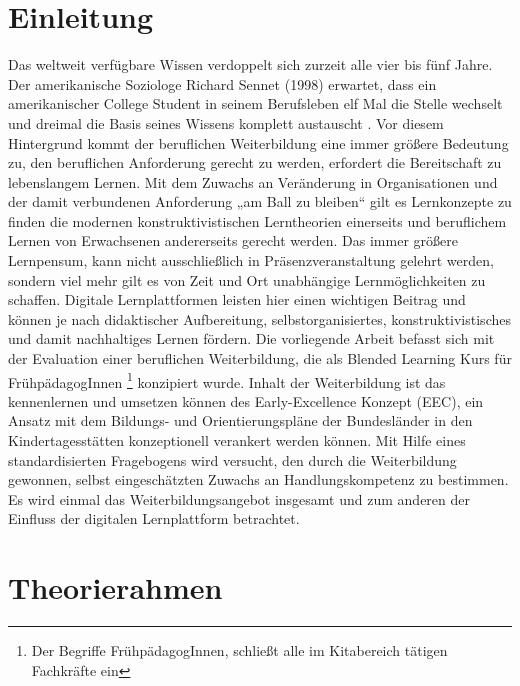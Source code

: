 \documentclass[12pt, bibliography=totoc]{scrartcl}
\begin{document}
%
\tableofcontents
\listoftables
\listoffigures
\clearpage
\pagebreak
{}
\section{Einleitung}\label{einleitung}

\glqq Das weltweit verfügbare Wissen verdoppelt sich zurzeit alle vier
bis fünf Jahre. Der amerikanische Soziologe Richard Sennet (1998)
erwartet, dass ein amerikanischer College Student in seinem Berufsleben
elf Mal die Stelle wechselt und dreimal die Basis seines Wissens
komplett austauscht \parencite[138]{Ehlers2002}.\grqq{} Vor diesem
Hintergrund kommt der beruflichen Weiterbildung eine immer größere
Bedeutung zu, den beruflichen Anforderung gerecht zu werden, erfordert
die Bereitschaft zu lebenslangem Lernen. Mit dem Zuwachs an Veränderung
in Organisationen und der damit verbundenen Anforderung „am Ball zu
bleiben`` gilt es Lernkonzepte zu finden die modernen
konstruktivistischen Lerntheorien einerseits und beruflichem Lernen von
Erwachsenen andererseits gerecht werden. Das immer größere Lernpensum,
kann nicht ausschließlich in Präsenzveranstaltung gelehrt werden,
sondern viel mehr gilt es von Zeit und Ort unabhängige Lernmöglichkeiten
zu schaffen. Digitale Lernplattformen leisten hier einen wichtigen
Beitrag und können je nach didaktischer Aufbereitung,
selbstorganisiertes, konstruktivistisches und damit nachhaltiges Lernen
fördern. Die vorliegende Arbeit befasst sich mit der Evaluation einer
beruflichen Weiterbildung, die als Blended Learning Kurs für
FrühpädagogInnen
\footnote{Der Begriffe FrühpädagogInnen, schließt alle im Kitabereich tätigen Fachkräfte ein}
konzipiert wurde. Inhalt der Weiterbildung ist das kennenlernen und
umsetzen können des Early-Excellence Konzept (EEC), ein Ansatz mit dem
Bildungs- und Orientierungspläne der Bundesländer in den
Kindertagesstätten konzeptionell verankert werden können. Mit Hilfe
eines standardisierten Fragebogens wird versucht, den durch die
Weiterbildung gewonnen, selbst eingeschätzten Zuwachs an
Handlungskompetenz zu bestimmen. Es wird einmal das
Weiterbildungsangebot insgesamt und zum anderen der Einfluss der
digitalen Lernplattform betrachtet.

\section{Theorierahmen}\label{theorierahmen}
\end{document}
